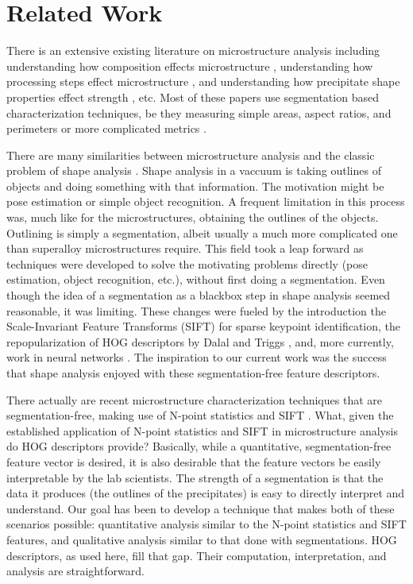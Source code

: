 \documentclass[review]{elsarticle}
\begin{document}
	\section{Related Work}\label{relatedwork}
		There is an extensive existing literature on microstructure analysis including understanding how composition effects microstructure \cite{stin2000} \cite{faehrmann}, understanding how processing steps effect microstructure \cite{gabb2011}, and understanding how precipitate shape properties effect strength \cite{sluytman}, etc. Most of these papers use segmentation based characterization techniques, be they measuring simple areas, aspect ratios, and perimeters \cite{underwood} or more complicated metrics \cite{twoDM, threeDM}.
		
		There are many similarities between microstructure analysis and the classic problem of shape analysis \cite{stegmann} \cite{belongie}. Shape analysis in a vaccuum is taking outlines of objects and doing something with that information. The motivation might be pose estimation \cite{stegmann} or simple object recognition\cite{belongie}. A frequent limitation in this process was, much like for the microstructures, obtaining the outlines of the objects. Outlining is simply a segmentation, albeit usually a much more complicated one than superalloy microstructures require. This field took a leap forward as techniques were developed to solve the motivating problems directly (pose estimation, object recognition, etc.), without first doing a segmentation. Even though the idea of a segmentation as a blackbox step in shape analysis seemed reasonable, it was limiting. These changes were fueled by the introduction the Scale-Invariant Feature Transforms (SIFT) \cite{sift} for sparse keypoint identification, the repopularization of HOG descriptors by Dalal and Triggs \cite{dalaltriggs}, and, more currently, work in neural networks \cite{alex}. The inspiration to our current work was the success that shape analysis enjoyed with these segmentation-free feature descriptors.

		There actually are recent microstructure characterization techniques that are segmentation-free, making use of N-point statistics \cite{kalidindi1, kalidindi2} and SIFT \cite{decost}. What, given the established application of N-point statistics and SIFT in microstructure analysis do HOG descriptors provide? Basically, while a quantitative, segmentation-free feature vector is desired, it is also desirable that the feature vectors be easily interpretable by the lab scientists. The strength of a segmentation is that the data it produces (the outlines of the precipitates) is easy to directly interpret and understand. Our goal has been to develop a technique that makes both of these scenarios possible: quantitative analysis similar to the N-point statistics and SIFT features, and qualitative analysis similar to that done with segmentations. HOG descriptors, as used here, fill that gap. Their computation, interpretation, and analysis are straightforward.
	
\end{document}
